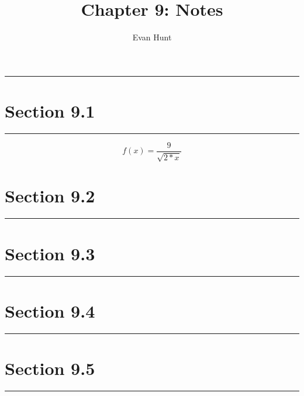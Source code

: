 \documentclass[12pt]{article}
\title{Chapter 9: Notes}
\author{Evan Hunt}
\begin{document}
    \maketitle

    \noindent\rule{\textwidth}{0.4pt}
    \section[]{Section 9.1}
    \noindent\rule{\textwidth}{0.4pt}
        \begin{equation}
            f(x) = \frac{9}{\sqrt{2*x}}
        \end{equation}
    \section[]{Section 9.2}
    \noindent\rule{\textwidth}{0.4pt}
    \section[]{Section 9.3}
    \noindent\rule{\textwidth}{0.4pt}
    \section[]{Section 9.4}
    \noindent\rule{\textwidth}{0.4pt}
    \section[]{Section 9.5}
    \noindent\rule{\textwidth}{0.4pt}
\end{document}
